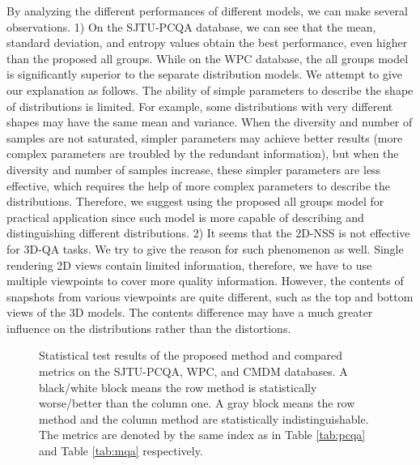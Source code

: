 \documentclass[lettersize,journal]{IEEEtran}
\begin{document}
{By analyzing the different performances of different models, we can make several observations. 1) On the SJTU-PCQA database, we can see that the mean, standard deviation, and entropy values obtain the best performance, even higher than the proposed all groups. While on the WPC database, the all groups model is significantly superior to the separate distribution models. We attempt to give our explanation as follows. The ability of simple parameters to describe the shape of distributions is limited. For example, some distributions with very different shapes may have the same mean and variance. When the diversity and number of samples are not saturated, simpler parameters may achieve better results (more complex parameters are troubled by the redundant information), but when the diversity and number of samples increase, these simpler parameters are less effective, which requires the help of more complex parameters to describe the distributions. Therefore, we suggest using the proposed all groups model for practical application since such model is more capable of describing and distinguishing different distributions. 2) It seems that the 2D-NSS is not effective for 3D-QA tasks. We try to give the reason for such phenomenon as well. Single rendering 2D views contain limited information, therefore, we have to use multiple viewpoints to cover more quality information. However, the contents of snapshots from various viewpoints are quite different, such as the top and bottom views of the 3D models. The contents difference may have a much greater influence on the distributions rather than the distortions. }





\begin{figure*}[htbp]
\centering
{}\caption{Statistical test results of the proposed method and compared metrics on the SJTU-PCQA, WPC, and CMDM databases. A black/white block means the row method is statistically worse/better than the column one. A gray block means the row method and the column method are statistically indistinguishable. The metrics are denoted by the same index as in Table \ref{tab:pcqa} and Table \ref{tab:mqa} respectively.}
\label{heatmap}
\vspace{-0.2cm}
\end{figure*}
\end{document}
